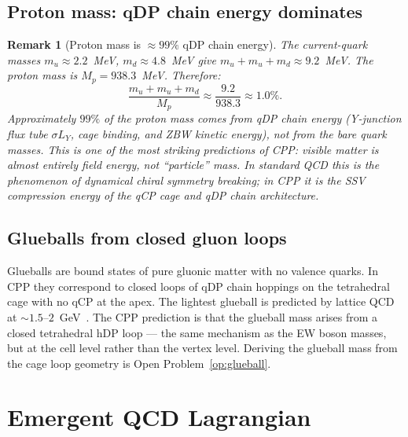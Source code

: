 \documentclass[11pt,letterpaper]{article}
\newtheorem{remark}[theorem]{Remark}
\begin{document}
\subsection{Proton mass: qDP chain energy dominates}

\begin{remark}[Proton mass is $\approx99\%$ qDP chain energy]
\label{rem:proton_mass}
The current-quark masses $m_u \approx 2.2$~MeV, $m_d \approx 4.8$~MeV
give $m_u + m_u + m_d \approx 9.2$~MeV.  The proton mass is
$M_p = 938.3$~MeV.  Therefore:
\begin{equation}
\frac{m_u+m_u+m_d}{M_p} \approx \frac{9.2}{938.3} \approx 1.0\%.
\label{eq:proton_chain_fraction}
\end{equation}
Approximately $99\%$ of the proton mass comes from qDP chain energy
(Y-junction flux tube $\sigma L_Y$, cage binding, and ZBW kinetic
energy), not from the bare quark masses.  This is one of the most
striking predictions of CPP: visible matter is almost entirely
field energy, not ``particle'' mass.  In standard QCD this is
the phenomenon of dynamical chiral symmetry breaking; in CPP it
is the SSV compression energy of the qCP cage and qDP chain
architecture.
\end{remark}

\subsection{Glueballs from closed gluon loops}

Glueballs are bound states of pure gluonic matter with no valence
quarks.  In CPP they correspond to closed loops of qDP chain
hoppings on the tetrahedral cage with no qCP at the apex.  The
lightest glueball is predicted by lattice QCD at
$\sim1.5$--$2$~GeV~\citep{morningstar1999}.  The CPP prediction
is that the glueball mass arises from a closed tetrahedral hDP
loop --- the same mechanism as the EW boson masses, but at the
cell level rather than the vertex level.  Deriving the glueball
mass from the cage loop geometry is Open Problem~\ref{op:glueball}.

\section{Emergent QCD Lagrangian}
\label{sec:lagrangian}
\end{document}
